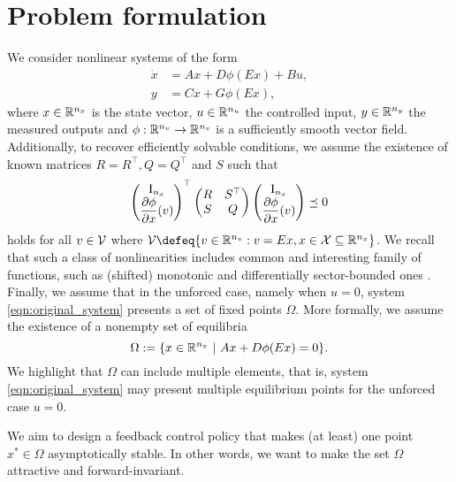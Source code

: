 \documentclass{ifacconf}
\begin{document}
\section{Problem formulation}
We consider nonlinear systems of the form
\begin{equation}\label{eqn:original_system}
\begin{aligned}
\dot x &=   A x  + D\phi(Ex) + Bu,  \\
 y&= Cx+ G\phi(Ex),
\end{aligned}
\end{equation}
where $x\in{\mathbb{R}}^{n_x}$ is the state vector,  $u\in{\mathbb{R}}^{n_u}$ the controlled input, $y\in{\mathbb{R}}^{n_y}$ the measured outputs and $\phi:{\mathbb{R}}^{n_v}\to{\mathbb{R}}^{n_v}$ is a sufficiently smooth vector field. Additionally, to recover efficiently solvable conditions, we assume the existence of known matrices $R=R^\top, Q=Q^\top$ and $S$ such that 
\begin{equation}\label{eqn:generic_abstraction}
    \left(\begin{matrix}\operatorname{I}_{n_x}\\\dfrac{\partial \phi}{\partial x}(v)\end{matrix}\right)^\top\left(\begin{matrix}R&S^\top\\S&Q\end{matrix}\right)\left(\begin{matrix}\operatorname{I}_{n_x}\\\dfrac{\partial \phi}{\partial x}(v)\end{matrix}\right)\preceq 0 
\end{equation}
holds for all $v\in{\mathcal{V}}$ where $\cV\defeq\{v\in\RR^{n_v}:v=E x, x\in\cX\subseteq \RR^{n_x}\}$. We recall that such a class of nonlinearities includes common and interesting family of functions, such as (shifted) monotonic and differentially sector-bounded ones \citep{zoboli2024quadratic}. 
Finally, we assume that in the unforced case, namely when $u=0$, system \eqref{eqn:original_system} presents a set of fixed points $\Omega$. More formally, we assume the existence of a nonempty set of equilibria
\begin{equation}\label{eqn:eq_points}
 \Omega := \{x\in{\mathbb{R}}^{n_x} \ | \ Ax+D\phi(E x)= 0\}.
\end{equation}
We highlight that $\Omega$ can include multiple elements, that is, system \eqref{eqn:original_system}  may present multiple equilibrium points for the unforced case $u=0$. 

We aim to design a feedback control policy that makes (at least) one point $x^*\in\Omega$ asymptotically stable. In other words, we want to make the set $\Omega$ attractive and forward-invariant. 
\end{document}
